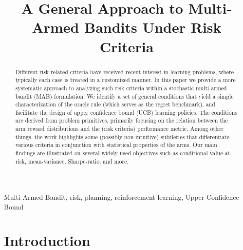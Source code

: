 \documentclass[final,12pt]{colt2018}
\title[Risk Criteria in Multi-Armed Bandits]{A General Approach to Multi-Armed Bandits Under Risk Criteria}
\begin{document}
	
	\maketitle
	
	\begin{abstract}
		Different risk-related criteria have received recent interest in learning problems, where typically each case is  treated in a customized manner. In this paper we provide a more systematic approach to analyzing  such risk criteria within a stochastic multi-armed bandit (MAB) formulation. We identify a set of general conditions that yield a simple characterization of the oracle rule (which serves as the regret benchmark), and facilitate the design of upper confidence bound (UCB) learning policies. The conditions are derived from problem primitives, primarily focusing on the relation between the arm reward distributions and the (risk criteria) performance metric. Among other things, the work highlights some (possibly non-intuitive) subtleties that differentiate various criteria in conjunction with statistical properties of the arms. Our main findings are illustrated on several widely used objectives such as conditional value-at-risk, mean-variance, Sharpe-ratio, and more.
	\end{abstract}
	
	
	
	
	\begin{keywords}
		Multi-Armed Bandit, risk, planning, reinforcement learning, Upper Confidence Bound
	\end{keywords}
	
	\section{Introduction} \label{sec:intro}
	
\end{document}
